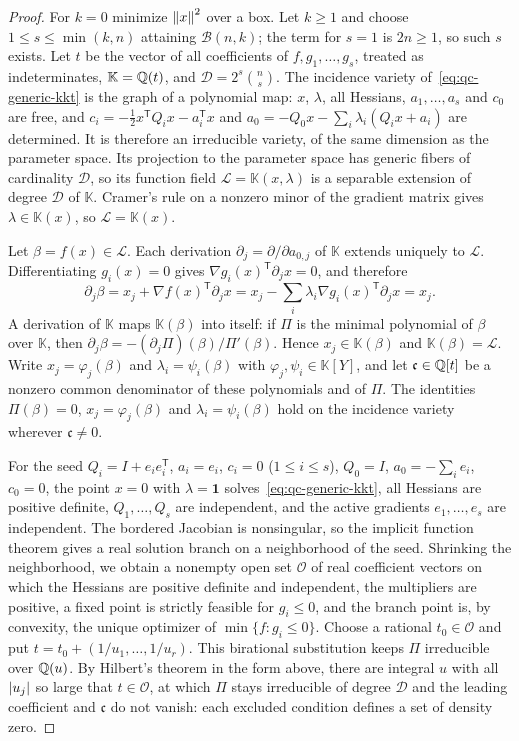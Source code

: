 \begin{proof}
For $k=0$ minimize $\left\lVert x\right\rVert^2$ over a box. Let $k\ge1$ and choose
$1\le s\le\min(k,n)$ attaining $\mathcal B(n,k)$; the term for $s=1$ is $2n\ge1$,
so such $s$ exists. Let $t$ be the vector of all coefficients of
$f,g_1,\ldots,g_s$, treated as indeterminates, $\mathbb K=\mathbb Q(t)$, and
$\mathcal D=2^s\binom ns$. The incidence variety of~\eqref{eq:qc-generic-kkt}
is the graph of a polynomial map: $x$, $\lambda$, all Hessians,
$a_1,\ldots,a_s$ and $c_0$ are free, and $c_i=-\tfrac12x^{\mathsf T}Q_ix-
a_i^{\mathsf T}x$ and $a_0=-Q_0x-\sum_i\lambda_i(Q_ix+a_i)$ are determined.
It is therefore an irreducible variety, of the same dimension as the
parameter space. Its projection to the parameter space has generic fibers of
cardinality $\mathcal D$, so its function field $\mathcal L=\mathbb K(x,\lambda)$
is a separable extension of degree $\mathcal D$ of $\mathbb K$. Cramer's rule
on a nonzero minor of the gradient matrix gives $\lambda\in\mathbb K(x)$, so
$\mathcal L=\mathbb K(x)$.

Let $\beta=f(x)\in\mathcal L$. Each derivation $\partial_j=\partial/\partial
a_{0,j}$ of $\mathbb K$ extends uniquely to $\mathcal L$. Differentiating
$g_i(x)=0$ gives $\nabla g_i(x)^{\mathsf T}\partial_jx=0$, and therefore
\[
\partial_j\beta=x_j+\nabla f(x)^{\mathsf T}\partial_jx
=x_j-\sum_i\lambda_i\nabla g_i(x)^{\mathsf T}\partial_jx=x_j .
\]
A derivation of $\mathbb K$ maps $\mathbb K(\beta)$ into itself: if
$\Pi$ is the minimal polynomial of $\beta$ over $\mathbb K$, then
$\partial_j\beta=-(\partial_j\Pi)(\beta)/\Pi'(\beta)$. Hence
$x_j\in\mathbb K(\beta)$ and $\mathbb K(\beta)=\mathcal L$. Write
$x_j=\varphi_j(\beta)$ and $\lambda_i=\psi_i(\beta)$ with
$\varphi_j,\psi_i\in\mathbb K[Y]$, and let $\mathfrak c\in\mathbb Q[t]$ be a nonzero
common denominator of these polynomials and of $\Pi$. The identities
$\Pi(\beta)=0$, $x_j=\varphi_j(\beta)$ and $\lambda_i=\psi_i(\beta)$ hold on
the incidence variety wherever $\mathfrak c\ne0$.

For the seed $Q_i=I+e_ie_i^{\mathsf T}$, $a_i=e_i$, $c_i=0$ ($1\le i\le s$),
$Q_0=I$, $a_0=-\sum_ie_i$, $c_0=0$, the point $x=0$ with $\lambda=\mathbf1$
solves~\eqref{eq:qc-generic-kkt}, all Hessians are positive definite,
$Q_1,\ldots,Q_s$ are independent, and the active gradients $e_1,\ldots,e_s$ are
independent. The bordered Jacobian is nonsingular, so the implicit function
theorem gives a real solution branch on a neighborhood of the seed. Shrinking
the neighborhood, we obtain a nonempty open set $\mathcal O$ of real
coefficient vectors on which the Hessians are positive definite and
independent, the multipliers are positive, a fixed point is strictly feasible
for $g_i\le0$, and the branch point is, by convexity, the unique optimizer of
$\min\{f:g_i\le0\}$. Choose a rational $t_0\in\mathcal O$ and put
$t=t_0+(1/u_1,\ldots,1/u_r)$. This birational substitution keeps $\Pi$
irreducible over $\mathbb Q(u)$. By Hilbert's theorem in the form above, there are
integral $u$ with all $\left\lvert u_j\right\rvert$ so large that $t\in\mathcal O$, at which
$\Pi$ stays irreducible of degree $\mathcal D$ and the leading coefficient and
$\mathfrak c$ do not vanish: each excluded condition defines a set of density
zero.


\end{proof}
